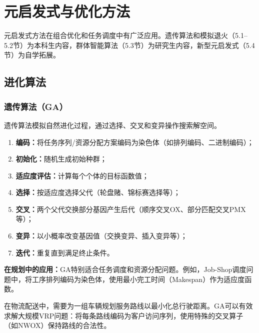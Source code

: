 \chapter{元启发式与优化方法}

\begin{levelbox}
元启发式方法在组合优化和任务调度中有广泛应用。遗传算法和模拟退火（5.1--5.2节）为本科生内容，群体智能算法（5.3节）为研究生内容，新型元启发式（5.4节）为自学拓展。
\end{levelbox}

\section{进化算法 \ug}

\subsection{遗传算法（GA）}

遗传算法模拟自然进化过程，通过选择、交叉和变异操作搜索解空间。

\begin{algbox}[title={\textbf{遗传算法基本框架}}]
\begin{enumerate}
  \item \textbf{编码：}将任务序列/资源分配方案编码为染色体（如排列编码、二进制编码）；
  \item \textbf{初始化：}随机生成初始种群；
  \item \textbf{适应度评估：}计算每个个体的目标函数值；
  \item \textbf{选择：}按适应度选择父代（轮盘赌、锦标赛选择等）；
  \item \textbf{交叉：}两个父代交换部分基因产生后代（顺序交叉OX、部分匹配交叉PMX等）；
  \item \textbf{变异：}以小概率改变基因值（交换变异、插入变异等）；
  \item \textbf{迭代：}重复直到满足终止条件。
\end{enumerate}
\end{algbox}

\textbf{在规划中的应用：}GA特别适合任务调度和资源分配问题。例如，Job-Shop调度问题中，将工序排列编码为染色体，使用最小完工时间（Makespan）作为适应度函数。

\begin{appbox}[title={\textbf{应用：车辆路径规划（VRP）}}]
在物流配送中，需要为一组车辆规划服务路线以最小化总行驶距离。GA可以有效求解大规模VRP问题：将每条路线编码为客户访问序列，使用特殊的交叉算子（如NWOX）保持路线的合法性。
\end{appbox}

